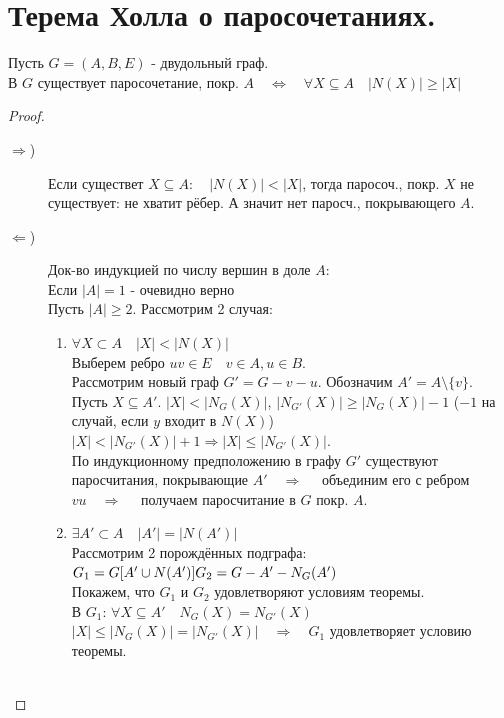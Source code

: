 \documentclass[12pt]{article}
\begin{document}
\section{Терема Холла о паросочетаниях.}
	Пусть $G = (A, B, E)$ - двудольный граф.\\
	В $G$ существует паросочетание, покр. $A \quad \Leftrightarrow \quad \forall X \subseteq A \quad |N(X)| \ge |X|$
	\begin{proof}\hfil
		\begin{description}
			\item[$ \Rightarrow $)] Если существет $X \subseteq A:  \quad |N(X)| < |X|$, тогда паросоч., покр. $X$ не существует: не хватит рёбер. А значит нет паросч., покрывающего $A$.
			\item[$ \Leftarrow $)]Док-во индукцией по числу вершин в доле $A$:\\
				Если $|A|=1$ - очевидно верно\\
				Пусть $|A| \ge 2$. Рассмотрим 2 случая:
				\begin{enumerate}
					\item $\forall X \subset A \quad |X| < |N(X)|$\\
						Выберем ребро $uv \in E \quad v\in A, u \in B$.\\
						Рассмотрим новый граф $G' = G- v-u$. Обозначим $A' = A \setminus \{ v\}$.\\
						Пусть $X \subseteq A'$. $|X| < |N_G(X)|$, $|N_{G'}(X)| \ge |N_G(X)|-1$ ($-1$ на случай, если $y$ входит в $N(X)$)\\
						$|X| < |N_{G'}(X)|+1 \Rightarrow |X| \le |N_{G'}(X)|$.\\
						По индукционному предположению в графу $G'$ существуют паросчитания,
						покрывающие $A' \quad  \Rightarrow  \quad $ объединим его с ребром $vu \quad  \Rightarrow  \quad $ получаем паросчитание в $G$ покр. $A$.
					\item $\exists A' \subset A \quad |A'| = |N(A')|$\\
						Рассмотрим 2 порождённых подграфа:\\
						$G_1 = G[A' \cup N(A')]\\
						G_2 = G - A' - N_G(A')$\\
						Покажем, что $G_1$ и $G_2$ удовлетворяют условиям теоремы.\\
						В $G_1$: $\forall X \subseteq A' \quad N_G(X)=N_{G'}(X)$\\
						$|X| \le |N_G(X)| = |N_{G'}(X)| \quad  \Rightarrow  \quad G_1$ удовлетворяет условию теоремы.\\\\

\end{enumerate}
\end{description}
\end{proof}
\end{document}
